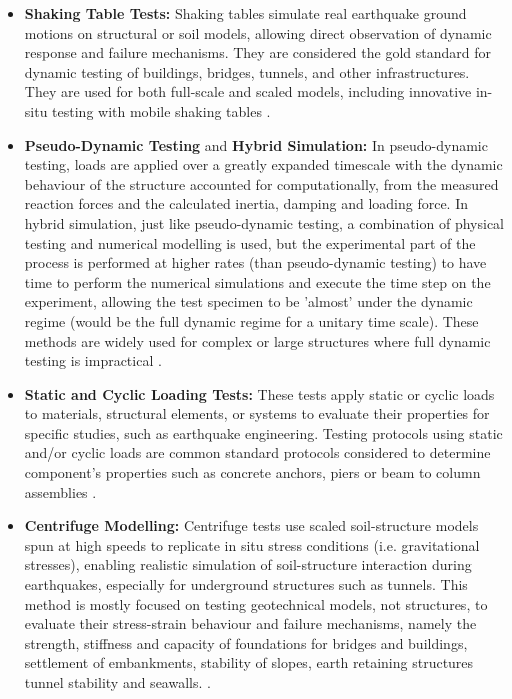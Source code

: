 \documentclass[  10pt, twoside]{report} %
\numberwithin{equation}{chapter}
\begin{document}
\begin{itemize}
    \item \textbf{Shaking Table Tests:} Shaking tables simulate real earthquake ground motions on structural or soil models, allowing direct observation of dynamic response and failure mechanisms. They are considered the gold standard for dynamic testing of buildings, bridges, tunnels, and other infrastructures. 
    They are used for both full-scale and scaled models, including innovative in-situ testing with mobile shaking tables \citep{williams2001,Bousias2017Experimental,Abovyan2024Method,Tsinidis2020Seismic,DeFelice2016Methods,El-Emam2018Experimental}. 
    \item \textbf{Pseudo-Dynamic Testing} and \textbf{Hybrid Simulation:} In pseudo-dynamic testing, loads are applied over a greatly expanded timescale with the dynamic behaviour of the structure accounted for computationally, from the measured reaction forces and the calculated inertia, damping and loading force. In hybrid simulation, just like pseudo-dynamic testing, a combination of physical testing and numerical modelling is used, but the experimental part of the process is performed at higher rates (than pseudo-dynamic testing) to have time to perform the numerical simulations and execute the time step on the experiment, allowing the test specimen to be 'almost' under the dynamic regime (would be the full dynamic regime for a unitary time scale). These methods are widely used for complex or large structures where full dynamic testing is impractical \citep{williams2001,Bousias2017Experimental}.
    \item \textbf{Static and Cyclic Loading Tests:} These tests apply static or cyclic loads to materials, structural elements, or systems to evaluate their properties for specific studies, such as earthquake engineering. Testing protocols using static and/or cyclic loads are common standard protocols considered to determine component's properties such as concrete anchors, piers or beam to column assemblies \citep{williams2001,Bousias2017Experimental,Fiorino2016Experimental}.
    \item \textbf{Centrifuge Modelling:} Centrifuge tests use scaled soil-structure models spun at high speeds to replicate in situ stress conditions (i.e. gravitational stresses), enabling realistic simulation of soil-structure interaction during earthquakes, especially for underground structures such as tunnels. This method is mostly focused on testing geotechnical models, not structures, to evaluate their stress-strain behaviour and failure mechanisms, namely the strength, stiffness and capacity of foundations for bridges and buildings, settlement of embankments, stability of slopes, earth retaining structures tunnel stability and seawalls. \citep{williams2001,Tsinidis2020Seismic}.

\end{itemize}
\end{document}
